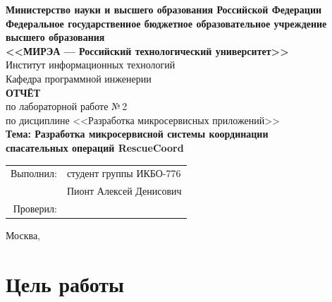 \documentclass[12pt,a4paper]{article}
\begin{document}
\thispagestyle{empty}

\begin{center}
    \textbf{Министерство науки и высшего образования Российской Федерации}\\[4pt]
    \textbf{Федеральное государственное бюджетное образовательное учреждение}\\
    \textbf{высшего образования}\\[6pt]
    \textbf{<<МИРЭА --- Российский технологический университет>>}\\[20pt]

    Институт информационных технологий\\[4pt]
    Кафедра программной инженерии\\[40pt]

    {\Large \textbf{ОТЧЁТ}}\\[8pt]
    {\large по лабораторной работе №\,2}\\[8pt]
    {\large по дисциплине <<Разработка микросервисных приложений>>}\\[20pt]

    {\LARGE \textbf{Тема: Разработка микросервисной системы координации}}\\
    {\LARGE \textbf{спасательных операций RescueCoord}}\\[40pt]
\end{center}

\begin{flushright}
    \begin{tabular}{rl}
        Выполнил: & студент группы ИКБО-776 \\[3pt]
                  & Пионт Алексей Денисович \\[10pt]
        Проверил: & \\
    \end{tabular}
\end{flushright}

\vfill

\begin{center}
    Москва, \the\year
\end{center}

\newpage

\tableofcontents
\newpage

\section{Цель работы}
\end{document}
